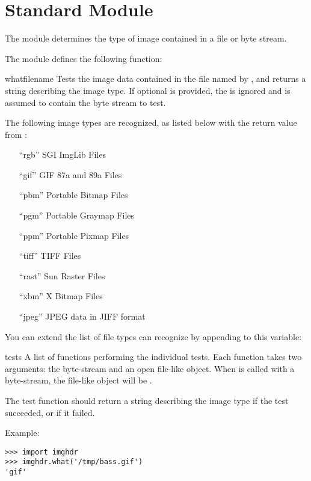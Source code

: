 \section{Standard Module }
\label{module-imghdr}

The  module determines the type of image contained in a
file or byte stream.

The  module defines the following function:

\renewcommand{\indexsubitem}{(in module imghdr)}

\begin{funcdesc}{what}{filename}
Tests the image data contained in the file named by ,
and returns a string describing the image type.  If optional 
is provided, the  is ignored and  is assumed to
contain the byte stream to test.
\end{funcdesc}

The following image types are recognized, as listed below with the
return value from :

\begin{enumerate}
\item[``rgb''] SGI ImgLib Files

\item[``gif''] GIF 87a and 89a Files

\item[``pbm''] Portable Bitmap Files

\item[``pgm''] Portable Graymap Files

\item[``ppm''] Portable Pixmap Files

\item[``tiff''] TIFF Files

\item[``rast''] Sun Raster Files

\item[``xbm''] X Bitmap Files

\item[``jpeg''] JPEG data in JIFF format
\end{enumerate}

You can extend the list of file types  can recognize by
appending to this variable:

\begin{datadesc}{tests}
A list of functions performing the individual tests.  Each function
takes two arguments: the byte-stream and an open file-like object.
When  is called with a byte-stream, the file-like
object will be .

The test function should return a string describing the image type if
the test succeeded, or  if it failed.
\end{datadesc}

Example:

\bcode\begin{verbatim}
>>> import imghdr
>>> imghdr.what('/tmp/bass.gif')
'gif'
\end{verbatim}\ecode
